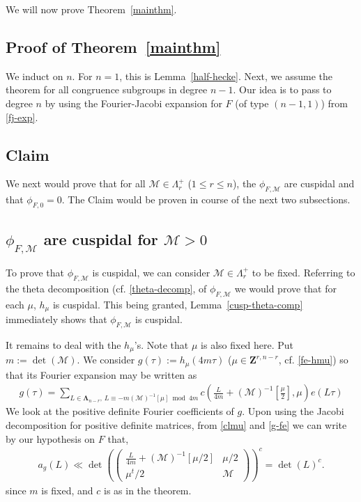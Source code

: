\documentclass[12pt]{amsart}
\numberwithin{equation}{section}
\theoremstyle{plain}
\newcommand{\thmref}[1]{Theorem~\ref{#1}}
\newcommand{\lemref}[1]{Lemma~\ref{#1}}
\theoremstyle{definition}
\newcommand{\mf}{\mathbf}
\newcommand{\mc}{\mathcal}
\begin{document}
We will now prove \thmref{mainthm}.
 
\subsection{Proof of \thmref{mainthm} }
We induct on $n$. For $n=1$, this is \lemref{half-hecke}. Next, we assume the theorem for all congruence subgroups in degree $n-1$. 
Our idea is to pass to degree $n$ by using the Fourier-Jacobi expansion for $F$ (of type $(n-1,1)$) from \eqref{fj-exp}.

\subsection{Claim} \label{claim}
We next would prove that for all $\mc M \in \Lambda_r^+$ ($1 \le r \le n$), the $\phi_{F, \mc M}$ are cuspidal and that $\phi_{F,0}=0$. 
The Claim would be proven in course of the next two subsections. 

\subsection{\texorpdfstring{$\phi_{F, \mc M}$ are cuspidal for $\mc M>0$}{a}}
To prove that $\phi_{F, \mc M}$ is cuspidal, we can consider $\mc M \in \Lambda_r^+$ to be fixed. Referring to the theta decomposition (cf. \eqref{theta-decomp}, of $\phi_{F, \mc M}$ we would prove that for each $\mu$, $h_\mu$ is cuspidal. This being granted, Lemma~\ref{cusp-theta-comp} immediately shows that $\phi_{F, \mc M}$ is cuspidal.

It remains to deal with the $h_\mu$'s. Note that $\mu$ is also fixed here. Put $\displaystyle m:= \det(\mc M)$. We consider $\displaystyle g(\tau):=h_\mu(4m \tau)$ ($\mu \in \mf Z^{r,n-r}$, cf. \eqref{fe-hmu}) so that its Fourier expansion may be written as 
\begin{align} \label{g-fe}
    g(\tau) =  \sum_{ L \in \mf \Lambda_{n-r}, \, L \equiv - m(\mc M)^{-1}[\mu] \bmod{4m} } c \left(\frac{L}{4m} +  (\mc M)^{-1}[\frac{\mu}{2}] , \mu \right) e(L \tau)
\end{align}
We look at the positive definite Fourier coefficients of $g$.
Upon using the Jacobi decomposition for positive definite matrices, from \eqref{clmu} and \eqref{g-fe} we can write by our hypothesis on $F$ that,
\begin{align} \label{agL-coeff}
    a_g(L) \ll \det \left( \begin{pmatrix}
        \frac{L}{4m} + (\mc M)^{-1}[\mu/2]   & \mu/2 \\ \mu^t/2 & \mc M 
    \end{pmatrix} \right)^c =  \det(L)^c .
\end{align}
since $m$ is fixed, and $c$ is as in the theorem. 
\end{document}
